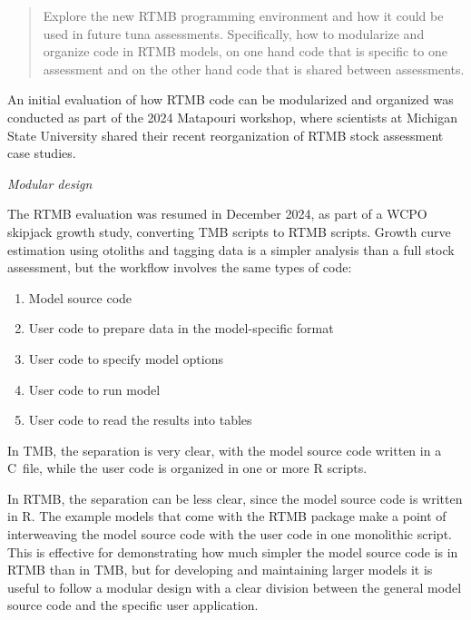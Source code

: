 \documentclass{SCreport}
\newcommand\cpp{\mbox{C\raisebox{0.5ex}{\tiny\bfseries ++}}}
\begin{document}
\begin{quote}\sf
  Explore the new RTMB programming environment and how it could be used in
  future tuna assessments. Specifically, how to modularize and organize code in
  RTMB models, on one hand code that is specific to one assessment and on the
  other hand code that is shared between assessments.
\end{quote}

\vspace{2ex}

An initial evaluation of how RTMB code can be modularized and organized was
conducted as part of the 2024 Matapouri workshop, where scientists at Michigan
State University shared their recent reorganization of RTMB stock assessment
case studies.

\textit{Modular design}

The RTMB evaluation was resumed in December 2024, as part of a WCPO skipjack
growth study, converting TMB scripts to RTMB scripts. Growth curve estimation
using otoliths and tagging data is a simpler analysis than a full stock
assessment, but the workflow involves the same types of code:

\begin{enumerate}
  \item Model source code\\[-4.5ex]
  \item User code to prepare data in the model-specific format\\[-4.5ex]
  \item User code to specify model options\\[-4.5ex]
  \item User code to run model\\[-4.5ex]
  \item User code to read the results into tables\\[-2.5ex]
\end{enumerate}

In TMB, the separation is very clear, with the model source code written in a
\cpp\ file, while the user code is organized in one or more R scripts.

In RTMB, the separation can be less clear, since the model source code is
written in R. The example models that come with the RTMB package make a point of
interweaving the model source code with the user code in one monolithic script.
This is effective for demonstrating how much simpler the model source code is in
RTMB than in TMB, but for developing and maintaining larger models it is useful
to follow a modular design with a clear division between the general model
source code and the specific user application.
\end{document}
